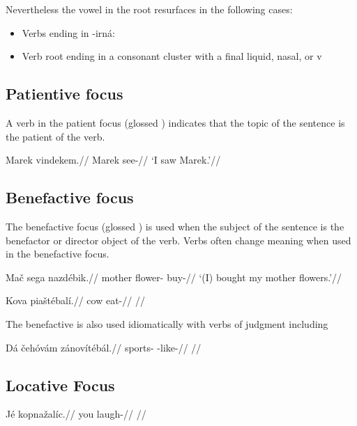 Nevertheless the vowel  in the root resurfaces in the following cases:

\begin{itemize}
	\item Verbs ending in -irn\'a:
	\item Verb root ending in a consonant cluster with a final liquid, nasal, or v
\end{itemize}

\subsection{Patientive focus}
\par A verb in the patient focus (glossed ) indicates that the topic of the sentence is the patient of the verb.

\pex
\begingl
\gla Marek vindekem.//
\glb Marek see-//
\glft `I saw Marek.'//
\endgl
\xe


\subsection{Benefactive focus}
\par The benefactive focus (glossed ) is used when the subject of the sentence is the benefactor or director object of the verb. Verbs often change meaning when used in the benefactive focus.

\pex
\begingl
\gla Ma\v{c} sega nazd\'ebik.//
\glb mother flower- buy-//
\glft `(I) bought my mother flowers.'//
\endgl
\xe

\pex
\begingl
\gla Kova pia\v{s}t\'ebal\'i.//
\glb cow eat-//
\glft {}//
\endgl
\xe

The benefactive is also used idiomatically with verbs of judgment including  

\pex
\begingl
\gla D\'a \v{c}eh\'ov\'am z\'anov\'it\'eb\'al.//
\glb {} sports- -like-//
\glft {}//
\endgl
\xe

\subsection{Locative Focus}

\pex
\begingl
\gla J\'e kopna\v{z}al\'ic.//
\glb you laugh-//
\glft {}//
\endgl
\xe

